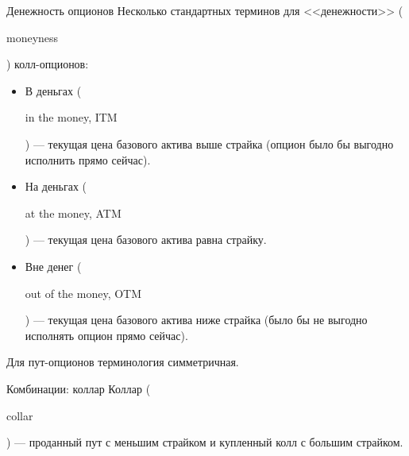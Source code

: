 \documentclass{beamer}
\newcommand{\en}[1]{\begin{otherlanguage}{english}#1\end{otherlanguage}}
\begin{document}
\begin{frame}{Денежность опционов}
\justify
Несколько стандартных терминов для <<денежности>> (\en{moneyness}) колл-опционов:

\begin{itemize}
\justifying
\item В деньгах (\en{in the money, ITM}) --- текущая цена базового актива выше страйка (опцион было бы выгодно исполнить прямо сейчас).
\item На деньгах (\en{at the money, ATM}) --- текущая цена базового актива равна страйку.
\item Вне денег (\en{out of the money, OTM}) --- текущая цена базового актива ниже страйка (было бы не выгодно исполнять опцион прямо сейчас).
\end{itemize}

\justify
Для пут-опционов терминология симметричная.
\end{frame}



\begin{frame}{Комбинации: коллар}
\justifying
Коллар (\en{collar}) --- проданный пут с меньшим страйком и купленный колл с большим страйком.

\justifying
\centering
\end{frame}
\end{document}
